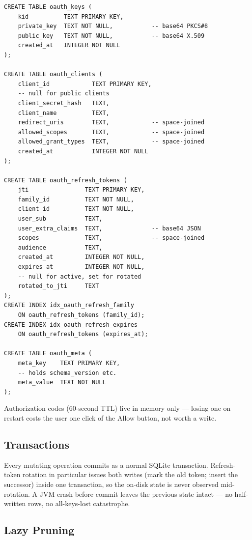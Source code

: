 \begin{lstlisting}[style=sql]
CREATE TABLE oauth_keys (
    kid          TEXT PRIMARY KEY,
    private_key  TEXT NOT NULL,           -- base64 PKCS#8
    public_key   TEXT NOT NULL,           -- base64 X.509
    created_at   INTEGER NOT NULL
);

CREATE TABLE oauth_clients (
    client_id            TEXT PRIMARY KEY,
    -- null for public clients
    client_secret_hash   TEXT,
    client_name          TEXT,
    redirect_uris        TEXT,            -- space-joined
    allowed_scopes       TEXT,            -- space-joined
    allowed_grant_types  TEXT,            -- space-joined
    created_at           INTEGER NOT NULL
);

CREATE TABLE oauth_refresh_tokens (
    jti                TEXT PRIMARY KEY,
    family_id          TEXT NOT NULL,
    client_id          TEXT NOT NULL,
    user_sub           TEXT,
    user_extra_claims  TEXT,              -- base64 JSON
    scopes             TEXT,              -- space-joined
    audience           TEXT,
    created_at         INTEGER NOT NULL,
    expires_at         INTEGER NOT NULL,
    -- null for active, set for rotated
    rotated_to_jti     TEXT
);
CREATE INDEX idx_oauth_refresh_family
    ON oauth_refresh_tokens (family_id);
CREATE INDEX idx_oauth_refresh_expires
    ON oauth_refresh_tokens (expires_at);

CREATE TABLE oauth_meta (
    meta_key    TEXT PRIMARY KEY,
    -- holds schema_version etc.
    meta_value  TEXT NOT NULL
);
\end{lstlisting}

\noindent
Authorization codes (60-second TTL) live in memory only --- losing one on restart costs the user one click of the Allow button, not worth a write.

\subsection{Transactions}

Every mutating operation commits as a normal SQLite transaction.  Refresh-token rotation in particular issues both writes (mark the old token; insert the successor) inside one transaction, so the on-disk state is never observed mid-rotation.  A JVM crash before commit leaves the previous state intact --- no half-written rows, no all-keys-lost catastrophe.

\subsection{Lazy Pruning}

